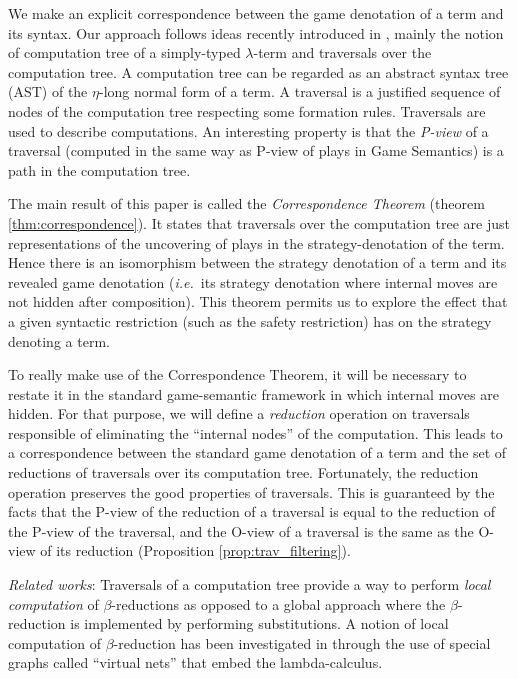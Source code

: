We make an explicit correspondence between the game denotation of a
term and its syntax. Our approach follows ideas recently introduced
in \cite{OngLics2006}, mainly the notion of computation tree of a
simply-typed $\lambda$-term and traversals over the computation
tree. A computation tree can be regarded as an abstract syntax tree
(AST) of the $\eta$-long normal form of a term. A traversal is a
justified sequence of nodes of the computation tree respecting some
formation rules. Traversals are used to describe computations. An
interesting property is that the \emph{P-view} of a traversal
(computed in the same way as P-view of plays in Game Semantics) is a
path in the computation tree.

The main result of this paper is called the
\emph{Correspondence Theorem} (theorem \ref{thm:correspondence}). It
states that traversals over the computation tree are just
representations of the uncovering of plays in the
strategy-denotation of the term. Hence there is an isomorphism
between the strategy denotation of a term and its revealed game
denotation ({\it i.e.}~its strategy denotation where internal moves are
not hidden after composition). This theorem permits us to explore
the effect that a given syntactic restriction (such as the safety restriction) has on the strategy
denoting a term.

To really make use of the Correspondence Theorem, it will be
necessary to restate it in the standard game-semantic framework in
which internal moves are hidden. For that purpose, we will define a
\emph{reduction} operation on traversals responsible of eliminating
the ``internal nodes'' of the computation. This leads to a
correspondence between the standard game denotation of a term and
the set of reductions of traversals over its computation tree.
Fortunately, the reduction operation preserves the good properties
of traversals. This is guaranteed by the facts that the P-view of
the reduction of a traversal is equal to the reduction of the P-view
of the traversal, and the O-view of a traversal is the same as the
O-view of its reduction (Proposition \ref{prop:trav_filtering}).
\vspace{8pt}

\emph{Related works}: Traversals of a computation tree provide a way
to perform \emph{local computation} of $\beta$-reductions as opposed
to a global approach where the $\beta$-reduction is implemented by
performing substitutions. A notion of local computation of
$\beta$-reduction has been investigated in
\cite{DanosRegnier-Localandasynchronou} through the use of special
graphs called ``virtual nets'' that embed the lambda-calculus.

